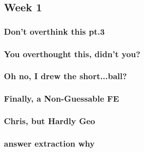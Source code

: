 \documentclass[titlepage=true]{scrartcl}
\begin{document}
{{    
    \subsection{Week 1}

    \subsubsection{Don't overthink this pt.3}
    \label{18.1.1}
    
    \newpage

    \subsubsection{You overthought this, didn't you?}
    \label{18.1.2}
    
    \newpage

    \subsubsection{Oh no, I drew the short...ball?}
    \label{18.1.3}
    
    \newpage

    \subsubsection{Finally, a Non-Guessable FE}
    \label{18.1.4}
    
    \newpage
    
    \subsubsection{Chris, but Hardly Geo}
    \label{18.1.5}
    
    \newpage

    \subsubsection{answer extraction why}
    \label{18.1.6}
    
    \newpage

    

}}
\end{document}
